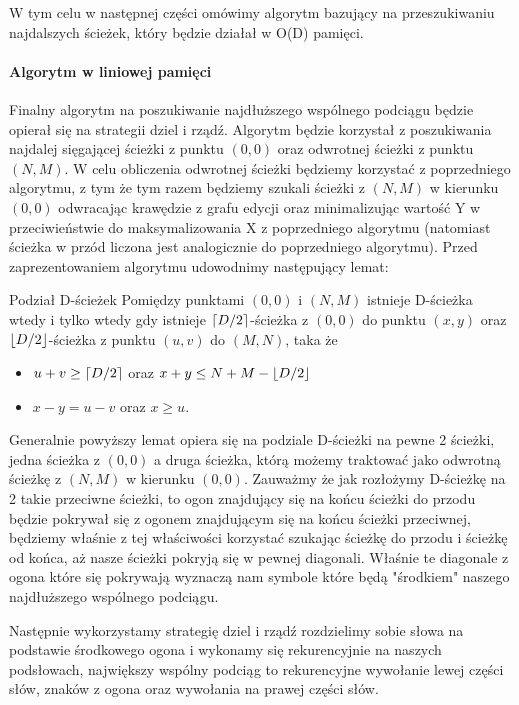 W tym celu w następnej części omówimy algorytm bazujący na przeszukiwaniu najdalszych ścieżek, który będzie działał w O(D) pamięci.

\paragraph{Algorytm w liniowej pamięci}

Finalny algorytm na poszukiwanie najdłuższego wspólnego podciągu będzie opierał się na strategii dziel i rządź. Algorytm będzie korzystał z poszukiwania najdalej sięgającej ścieżki z punktu $(0,0)$ oraz odwrotnej ścieżki z punktu $(N,M)$. W celu obliczenia odwrotnej ścieżki będziemy korzystać z poprzedniego algorytmu, z tym że tym razem będziemy szukali ścieżki z $(N,M)$ w kierunku $(0,0)$ odwracając krawędzie z grafu edycji oraz minimalizując wartość Y w przeciwieństwie do maksymalizowania X z poprzedniego algorytmu (natomiast ścieżka w przód liczona jest analogicznie do poprzedniego algorytmu). Przed zaprezentowaniem algorytmu udowodnimy następujący lemat:

\begin{lemma}{}{}{Podział D-ścieżek}
Pomiędzy punktami $(0,0)$ i $(N, M)$ istnieje D-ścieżka wtedy i tylko wtedy gdy istnieje $\ceil*{D/2}$-ścieżka z $(0,0)$ do punktu $(x,y)$ oraz $\floor*{D/2}$-ścieżka z punktu $(u,v)$ do $(M,N)$, taka że
\begin{itemize}
    \item $u+v \geq \ceil*{D/2}$ oraz $x+y \leq N + M - \floor*{D/2}$
    \item $x-y = u-v$ oraz $x \geq u$.
\end{itemize}
\end{lemma}

Generalnie powyższy lemat opiera się na podziale D-ścieżki na pewne 2 ścieżki, jedna ścieżka z $(0,0)$ a druga ścieżka, którą możemy traktować jako odwrotną ścieżkę z $(N,M)$ w kierunku $(0,0)$. Zauważmy że jak rozłożymy D-ścieżkę na 2 takie przeciwne ścieżki, to ogon znajdujący się na końcu ścieżki do przodu będzie pokrywał się z ogonem znajdującym się na końcu ścieżki przeciwnej, będziemy właśnie z tej właściwości korzystać szukając ścieżkę do przodu i ścieżkę od końca, aż nasze ścieżki pokryją się w pewnej diagonali. Właśnie te diagonale z ogona które się pokrywają wyznaczą nam symbole które będą "środkiem" naszego najdłuższego wspólnego podciągu. 

Następnie wykorzystamy strategię dziel i rządź rozdzielimy sobie słowa na podstawie środkowego ogona i wykonamy się rekurencyjnie na naszych podsłowach, największy wspólny podciąg to rekurencyjne wywołanie lewej części słów, znaków z ogona oraz wywołania na prawej części słów.


